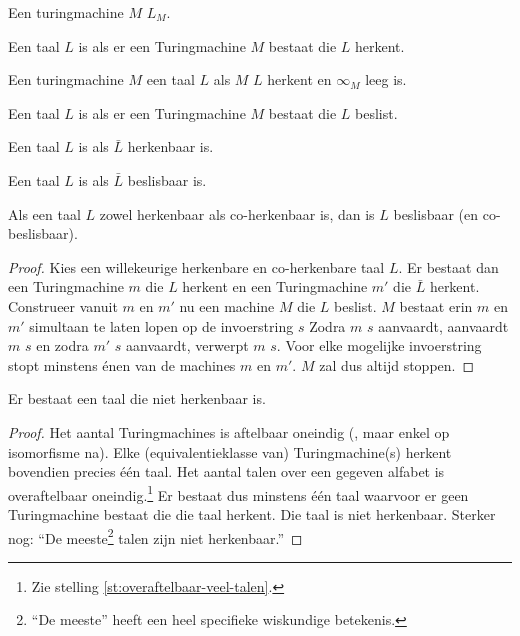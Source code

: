 \documentclass[main.tex]{subfiles}
\begin{document}
\begin{de}
  Een turingmachine $M$  $L_{M}$.
\end{de}

\begin{de}
  Een taal $L$ is  als er een Turingmachine $M$ bestaat die $L$ herkent.
\end{de}

\begin{de}
  Een turingmachine $M$  een taal $L$ als $M$ $L$ herkent en $\infty_{M}$ leeg is.
\end{de}

\begin{de}
  Een taal $L$ is  als er een Turingmachine $M$ bestaat die $L$ beslist.
\end{de}

\begin{de}
  Een taal $L$ is  als $\bar{L}$ herkenbaar is.
\end{de}

\begin{de}
  Een taal $L$ is  als $\bar{L}$ beslisbaar is.
\end{de}

\begin{st}
  \label{st:herk-plus-coherk-is-besl}
  Als een taal $L$ zowel herkenbaar als co-herkenbaar is, dan is $L$ beslisbaar (en co-beslisbaar).
  \begin{proof}
    Kies een willekeurige herkenbare en co-herkenbare taal $L$.
    Er bestaat dan een Turingmachine $m$ die $L$ herkent en een Turingmachine $m'$ die $\bar{L}$ herkent.
    Construeer vanuit $m$ en $m'$ nu een machine $M$ die $L$ beslist.
    $M$ bestaat erin $m$ en $m'$ simultaan te laten lopen op de invoerstring $s$
    Zodra $m$ $s$ aanvaardt, aanvaardt $m$ $s$ en zodra $m'$ $s$ aanvaardt, verwerpt $m$ $s$.
    Voor elke mogelijke invoerstring stopt minstens \'enen van de machines $m$ en $m'$.
    $M$ zal dus altijd stoppen.
  \end{proof}
\end{st}

\begin{st}
  Er bestaat een taal die niet herkenbaar is.
  \begin{proof}
    Het aantal Turingmachines is aftelbaar oneindig (, maar enkel op isomorfisme na).
    Elke (equivalentieklasse van) Turingmachine(s) herkent bovendien precies \'e\'en taal.
    Het aantal talen over een gegeven alfabet is overaftelbaar oneindig.\footnote{Zie stelling \ref{st:overaftelbaar-veel-talen}.}
    Er bestaat dus minstens \'e\'en taal waarvoor er geen Turingmachine bestaat die die taal herkent.
    Die taal is niet herkenbaar.
    Sterker nog: ``De meeste\footnote{``De meeste'' heeft een heel specifieke wiskundige betekenis.} talen zijn niet herkenbaar.''
  \end{proof}
\end{st}
\end{document}
